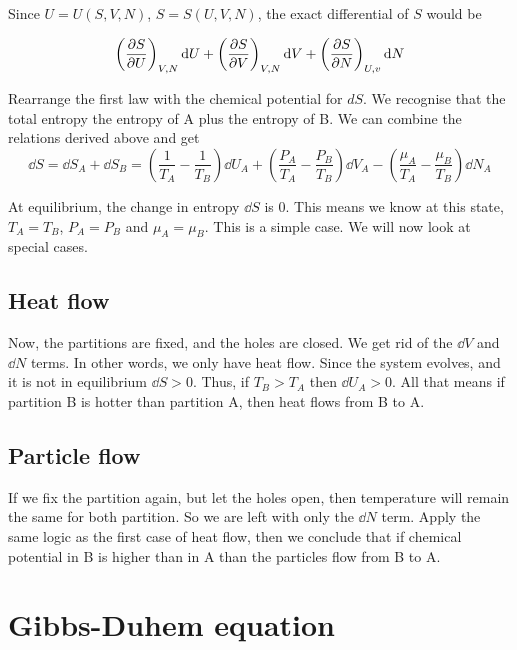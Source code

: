 \documentclass[12pt,chapterprefix=false,dvipsnames]{scrbook}
\theoremstyle{dotless}
\theoremstyle{definition}
\begin{document}
Since $U = U(S,V,N)$, $S = S(U,V,N)$, the
exact differential of $S$ would be

\begin{equation}
	{\left(\pdv{S}{U}\right)}_{V,N}\dd{U} +
	{\left(\pdv{S}{V}\right)}_{V,N}\dd{V} +
	{\left(\pdv{S}{N}\right)}_{U,v}\dd{N}
\end{equation}

Rearrange the first law with the chemical potential for
$dS$. We recognise that the total entropy the
entropy of A plus the entropy of B. We can combine the relations
derived above and get
\begin{equation}
	\dd{S} = \dd{S}_A +
	\dd{S}_B =
	\left(\frac{1}{T_A} - \frac{1}{T_B}\right)\dd{U}_A +
	\left(\frac{P_A}{T_A} - \frac{P_B}{T_B}\right)\dd{V}_A
	-\left(\frac{\mu_A}{T_A} - \frac{\mu_B}{T_B}\right)\dd{N}_A
\end{equation}

At equilibrium, the change in entropy $\dd{S}$ is
0. This means we know at this state, $T_A = T_B$,
$P_A = P_B$ and $\mu_A = \mu_B$. This is a
simple case. We will now look at special cases.

\subsection{Heat flow}%
\label{sub:heat_flow}

Now, the partitions are fixed, and the holes are closed. We get
rid of the $\dd{V}$ and $\dd{N}$
terms. In other words, we only have heat flow. Since the system
evolves, and it is not in equilibrium $\dd{S} > 0$.
Thus, if $T_B > T_A$ then $\dd{U}_A > 0$.
All that means if partition B is hotter than partition A, then
heat flows from B to A.

\subsection{Particle flow}%
\label{sub:particle_flow}

If we fix the partition again, but let the holes open, then
temperature will remain the same for both partition. So we are
left with only the $\dd{N}$ term. Apply the same
logic as the first case of heat flow, then we conclude that if
chemical potential in B is higher than in A than the particles
flow from B to A.

\section{Gibbs-Duhem equation}%
\label{sec:gibbs_duhem_equation}
\end{document}
